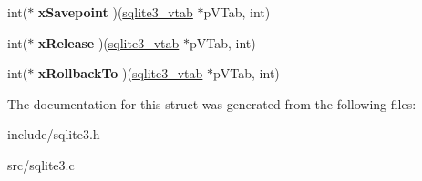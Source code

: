 \begin{DoxyCompactItemize}
\item 
\hypertarget{structsqlite3__module_af90f1df803fce1b90048864aeeeee890}{int($\ast$ {\bfseries x\-Savepoint} )(\hyperlink{structsqlite3__vtab}{sqlite3\-\_\-vtab} $\ast$p\-V\-Tab, int)}\label{structsqlite3__module_af90f1df803fce1b90048864aeeeee890}

\item 
\hypertarget{structsqlite3__module_a8dcaa6dc6d9563c8da57e4c8c5055609}{int($\ast$ {\bfseries x\-Release} )(\hyperlink{structsqlite3__vtab}{sqlite3\-\_\-vtab} $\ast$p\-V\-Tab, int)}\label{structsqlite3__module_a8dcaa6dc6d9563c8da57e4c8c5055609}

\item 
\hypertarget{structsqlite3__module_a767753c6c97d1f622e5113367a0547b5}{int($\ast$ {\bfseries x\-Rollback\-To} )(\hyperlink{structsqlite3__vtab}{sqlite3\-\_\-vtab} $\ast$p\-V\-Tab, int)}\label{structsqlite3__module_a767753c6c97d1f622e5113367a0547b5}

\end{DoxyCompactItemize}


The documentation for this struct was generated from the following files\-:\begin{DoxyCompactItemize}
\item 
include/sqlite3.\-h\item 
src/sqlite3.\-c\end{DoxyCompactItemize}

